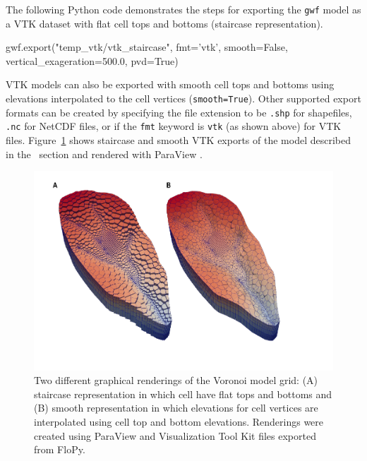 \documentclass[12pt, oneside]{article}  	%
\begin{document}
The following Python code demonstrates the steps for exporting the \texttt{gwf} model as a VTK dataset with flat cell tops and bottoms (staircase representation).

\begin{python}
gwf.export("temp_vtk/vtk_staircase", fmt='vtk', smooth=False,
           vertical_exageration=500.0, pvd=True)
\end{python}

\noindent VTK models can also be exported with smooth cell tops and bottoms using elevations interpolated to the cell vertices (\texttt{smooth=True}). Other supported export formats can be created by specifying the file extension to be \texttt{.shp} for shapefiles, \texttt{.nc} for NetCDF files, or if the \texttt{fmt} keyword is \texttt{vtk} (as shown above) for VTK files. Figure~\ref{fig:flopyvtk} shows staircase and smooth VTK exports of the model described in the~ section and rendered with ParaView \citep{ahrens2005paraview}.

\begin{figure}[ht!]
	\begin{center}
		\includegraphics{figures/mf6vtk.pdf}
	\end{center}
	\caption{Two different graphical renderings of the Voronoi model grid: (A) staircase representation in which cell have flat tops and bottoms and (B) smooth representation in which elevations for cell vertices are interpolated using cell top and bottom elevations. Renderings were created using ParaView \citep{ahrens2005paraview} and Visualization Tool Kit \citep{schroeder:2006:VTK} files exported from FloPy.}
	\label{fig:flopyvtk}
\end{figure}
\end{document}
